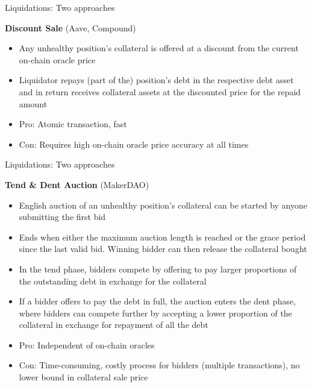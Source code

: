 \documentclass[handout]{beamer}
\begin{document}
\begin{frame}{Liquidations: Two approaches }


\vspace{1em}

\textbf{Discount Sale} (Aave, Compound)

\begin{itemize}
\item Any unhealthy position’s collateral is offered at a discount from the current on-chain oracle price
\item Liquidator repays (part of the) position’s debt in the respective debt asset and in return receives collateral assets at the discounted price for the repaid amount
\item Pro: Atomic transaction, fast
\item Con: Requires high on-chain oracle price accuracy at all times

\end{itemize}

	
\end{frame}


\begin{frame}{Liquidations: Two approaches }

\vspace{1em}

\textbf{Tend \& Dent Auction} (MakerDAO)

\begin{itemize}
\item English auction of an unhealthy position’s collateral can be started by anyone submitting the first bid
\item Ends when either the maximum auction length is reached or the grace period since the last valid bid. Winning bidder can then release the collateral bought


\item In the tend phase, bidders compete by offering to pay larger proportions of the outstanding debt in exchange for the collateral
\item If a bidder offers to pay the debt in full, the auction enters the dent phase, where bidders can compete further by accepting a lower proportion of the collateral in exchange for repayment of all the debt

\item Pro: Independent of on-chain oracles

\item Con: Time-consuming, costly process for bidders (multiple transactions), no lower bound in collateral sale price
\end{itemize}

	
\end{frame}
\end{document}
